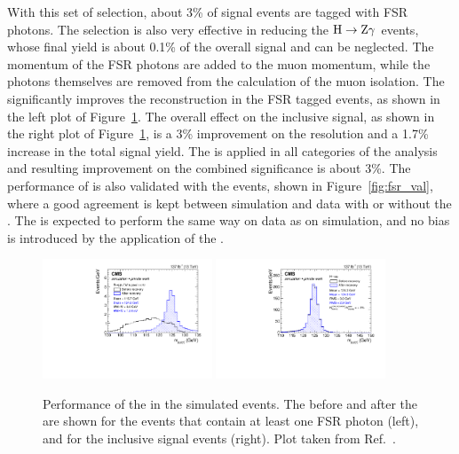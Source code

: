 With this set of selection, about 3\% of signal events are tagged with FSR photons.
The selection is also very effective in reducing the $\mathrm{H} \to \mathrm{Z}\gamma$ events,
whose final yield is about 0.1\% of the overall \hmm signal and can be neglected.
The momentum of the FSR photons are added to the muon momentum, 
while the photons themselves are removed from the calculation of the muon isolation.
The \FSR significantly improves the \mmm reconstruction in the FSR tagged events, as shown in the left plot of Figure~\ref{fig:fsr_sig}.
The overall effect on the inclusive signal, as shown in the right plot of Figure~\ref{fig:fsr_sig}, 
is a 3\% improvement on the \mmm resolution and a 1.7\% increase in the total signal yield. 
The \FSR is applied in all categories of the \hmm analysis and resulting improvement on the combined significance is about 3\%.
The performance of \FSR is also validated with the \zmm events, shown in Figure~\ref{fig:fsr_val},
where a good agreement is kept between simulation and data with or without the \FSR. 
The \FSR is expected to perform the same way on data as on simulation, 
and no bias is introduced by the application of the \FSR. 

\begin{figure}[!htb]
      \centering
      \includegraphics[width=0.45\textwidth]{pics/muon_corr/FSR/FSRrecovery_FSRtagged.pdf}
      \includegraphics[width=0.45\textwidth]{pics/muon_corr/FSR/FSRrecovery_FullSignal.pdf}
      \caption{Performance of the \FSR in the simulated \hmm events. 
               The \mmm before and after the \FSR are shown for the events that contain at least one FSR photon (left),
               and for the inclusive signal events (right).
               Plot taken from Ref.~\cite{oliverthesis}.}
      \label{fig:fsr_sig}
\end{figure}

